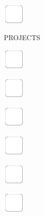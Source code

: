 \documentclass[11pt,titlepage]{article}
\begin{document}
\vspace{12mm}

\noindent
\includegraphics[]{checkbox-6mm.pdf}

\pagebreak

\small
\hfill PROJECTS

\vspace{6mm}

\noindent
\includegraphics[]{checkbox-6mm.pdf}

\vspace{12mm}

\noindent
\includegraphics[]{checkbox-6mm.pdf}

\vspace{12mm}

\noindent
\includegraphics[]{checkbox-6mm.pdf}

\vspace{12mm}

\noindent
\includegraphics[]{checkbox-6mm.pdf}

\vspace{12mm}

\noindent
\includegraphics[]{checkbox-6mm.pdf}

\vspace{12mm}

\noindent
\includegraphics[]{checkbox-6mm.pdf}
\end{document}
